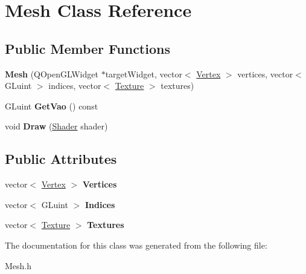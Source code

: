 \hypertarget{class_mesh}{}\section{Mesh Class Reference}
\label{class_mesh}
\subsection*{Public Member Functions}
\begin{DoxyCompactItemize}
\item 
\hypertarget{class_mesh_a9a4b7f1b6b50b9ad7e80c5d61d2b221b}{}{\bfseries Mesh} (Q\+Open\+G\+L\+Widget $\ast$target\+Widget, vector$<$ \hyperlink{struct_vertex}{Vertex} $>$ vertices, vector$<$ G\+Luint $>$ indices, vector$<$ \hyperlink{struct_texture}{Texture} $>$ textures)\label{class_mesh_a9a4b7f1b6b50b9ad7e80c5d61d2b221b}

\item 
\hypertarget{class_mesh_a7a01e69fcc56f348f7c91e1420b14e0e}{}G\+Luint {\bfseries Get\+Vao} () const \label{class_mesh_a7a01e69fcc56f348f7c91e1420b14e0e}

\item 
\hypertarget{class_mesh_a143c8d7c179801c6377853db26d4a19f}{}void {\bfseries Draw} (\hyperlink{class_shader}{Shader} shader)\label{class_mesh_a143c8d7c179801c6377853db26d4a19f}

\end{DoxyCompactItemize}
\subsection*{Public Attributes}
\begin{DoxyCompactItemize}
\item 
\hypertarget{class_mesh_abd28c74398f02e1afaa959c40bdd6df0}{}vector$<$ \hyperlink{struct_vertex}{Vertex} $>$ {\bfseries Vertices}\label{class_mesh_abd28c74398f02e1afaa959c40bdd6df0}

\item 
\hypertarget{class_mesh_ae293e39cb11bde8d46fe77ef622893bd}{}vector$<$ G\+Luint $>$ {\bfseries Indices}\label{class_mesh_ae293e39cb11bde8d46fe77ef622893bd}

\item 
\hypertarget{class_mesh_a10fa55f46fc6c5bb237525ed5343e73c}{}vector$<$ \hyperlink{struct_texture}{Texture} $>$ {\bfseries Textures}\label{class_mesh_a10fa55f46fc6c5bb237525ed5343e73c}

\end{DoxyCompactItemize}


The documentation for this class was generated from the following file\+:\begin{DoxyCompactItemize}
\item 
Mesh.\+h\end{DoxyCompactItemize}

